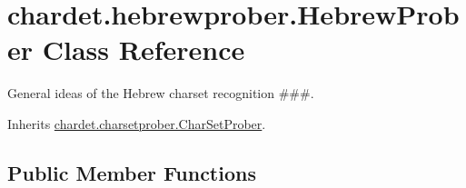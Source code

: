 \hypertarget{classchardet_1_1hebrewprober_1_1_hebrew_prober}{}\section{chardet.\+hebrewprober.\+Hebrew\+Prober Class Reference}
\label{classchardet_1_1hebrewprober_1_1_hebrew_prober}


General ideas of the Hebrew charset recognition \#\#\#.  




Inherits \hyperlink{classchardet_1_1charsetprober_1_1_char_set_prober}{chardet.\+charsetprober.\+Char\+Set\+Prober}.

\subsection*{Public Member Functions}
